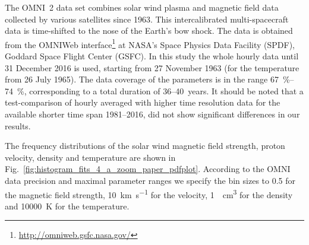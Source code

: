 The OMNI~2 data set \citep{King2005} combines solar wind plasma and magnetic field data collected by various satellites since 1963. This intercalibrated multi-spacecraft data is time-shifted to the nose of the Earth’s bow shock. The data is obtained from the OMNIWeb interface\footnote{\url{http://omniweb.gsfc.nasa.gov/}} at NASA's Space Physics Data Facility (SPDF), Goddard Space Flight Center (GSFC).
%
In this study the whole hourly data until 31 December 2016 is used, starting from 27 November 1963 (for the temperature from 26 July 1965). The data coverage of the parameters is in the range \SIrange{67}{74}{\percent},  corresponding to a total duration of 36--40~years.
%
It should be noted that a test-comparison of hourly averaged with higher time resolution data for the available shorter time span 1981--2016, did not show significant differences in our results.

The frequency distributions of the solar wind magnetic field strength, proton velocity, density and temperature are shown in Fig.~\ref{fig:histogram_fits_4_a_zoom_paper_pdfplot}. According to the OMNI data precision and maximal parameter ranges we specify the bin sizes to \SI{0.5}{\nT} for the magnetic field strength, \SI{10}{\km\per\s} for the velocity, \SI{1}{\per\cm\cubed} for the density and \SI{10000}{\K} for the temperature.

